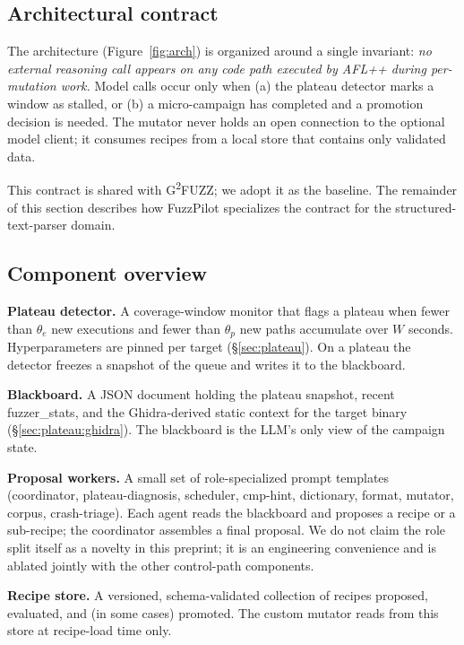 \documentclass[11pt]{article}
\begin{document}
\subsection{Architectural contract}
\label{sec:design:contract}

The architecture (Figure~\ref{fig:arch}) is organized around a
single invariant: \emph{no external reasoning call appears on any code path
executed by AFL++ during per-mutation work.} Model calls occur
only when (a) the plateau detector marks a window as stalled, or
(b) a micro-campaign has completed and a promotion decision is
needed. The mutator never holds an open connection to the optional
model client; it consumes recipes from a local store that contains only
validated data.

This contract is shared with G\textsuperscript{2}FUZZ; we adopt it
as the baseline. The remainder of this section describes how
FuzzPilot specializes the contract for the structured-text-parser
domain.

\subsection{Component overview}
\label{sec:design:components}

\textbf{Plateau detector.} A coverage-window monitor that flags a
plateau when fewer than $\theta_e$ new executions and fewer than
$\theta_p$ new paths accumulate over $W$ seconds. Hyperparameters are
pinned per target (\S\ref{sec:plateau}).
On a plateau the detector freezes a snapshot of the queue and writes
it to the blackboard.

\textbf{Blackboard.} A JSON document holding the plateau snapshot,
recent fuzzer\_stats, and the Ghidra-derived static context for
the target binary (\S\ref{sec:plateau:ghidra}). The blackboard is
the LLM's only view of the campaign state.

\textbf{Proposal workers.} A small set of role-specialized prompt templates
(coordinator, plateau-diagnosis, scheduler, cmp-hint, dictionary,
format, mutator, corpus, crash-triage). Each agent reads the
blackboard and proposes a recipe or a sub-recipe; the coordinator
assembles a final proposal. We do not claim the role split itself as
a novelty in this preprint; it is an engineering convenience and is
ablated jointly with the other control-path components.

\textbf{Recipe store.} A versioned, schema-validated collection of
recipes proposed, evaluated, and (in some cases) promoted. The
custom mutator reads from this store at recipe-load time only.
\end{document}
